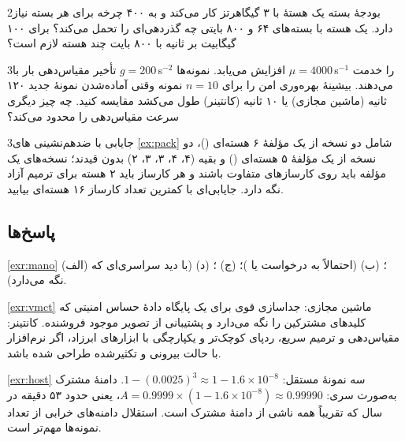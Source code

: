 \documentclass[11pt,a4paper]{article}
\begin{document}
\begin{exercisebox}{2}{بودجهٔ بسته}\label{exr:cycles}
یک هستهٔ  با ۳ گیگاهرتز کار می‌کند و به ۴۰۰ چرخه برای هر بسته نیاز دارد. یک هسته با بسته‌های ۶۴ و ۸۰۰ بایتی چه
گذردهی‌ای را تحمل می‌کند؟ برای ۱۰۰ گیگابیت بر ثانیه با ۸۰۰ بایت چند هسته لازم است؟
\end{exercisebox}

\begin{exercisebox}{3}{تأخیر مقیاس‌دهی}\label{exr:lag}
بار با $g = 200$\,s$^{-2}$ افزایش می‌یابد. نمونه‌ها $\mu = 4000$\,s$^{-1}$ را خدمت می‌دهند. بیشینهٔ بهره‌وری امن را برای $n = 10$
نمونه وقتی آماده‌شدن نمونهٔ جدید ۱۲۰ ثانیه (ماشین مجازی) یا ۱۰ ثانیه (کانتینر) طول می‌کشد مقایسه کنید. چه چیز دیگری سرعت
مقیاس‌دهی را محدود می‌کند؟
\end{exercisebox}

\begin{exercisebox}{3}{جایابی با ضدهم‌نشینی}\label{exr:pack}
های \cref{ex:pack} شامل دو نسخه از یک مؤلفهٔ ۶ هسته‌ای ()، دو نسخه از یک مؤلفهٔ ۵ هسته‌ای () و بقیه
(۴، ۴، ۳، ۳، ۲) بدون قیدند؛ نسخه‌های یک مؤلفه باید روی کارسازهای متفاوت باشند و هر کارساز باید ۲ هسته برای ترمیم آزاد نگه
دارد. جایابی‌ای با کمترین تعداد کارساز ۱۶ هسته‌ای بیابید.
\end{exercisebox}

\subsection*{پاسخ‌ها}

\begin{solutionbox}{\ref{exr:mano}}
(الف) ؛ (ب)  (احتمالاً به درخواست  یا )؛ (ج) ؛ (د)  (با دید
سراسری‌ای که  نگه می‌دارد).
\end{solutionbox}

\begin{solutionbox}{\ref{exr:vmct}}
ماشین مجازی: جداسازی قوی برای یک پایگاه دادهٔ حساس امنیتی که کلیدهای مشترکین را نگه می‌دارد و پشتیبانی از تصویر موجود
فروشنده. کانتینر: مقیاس‌دهی و ترمیم سریع، ردپای کوچک‌تر و یکپارچگی با ابزارهای ابرزاد، اگر نرم‌افزار  با حالت
بیرونی و تکثیرشده طراحی شده باشد.
\end{solutionbox}

\begin{solutionbox}{\ref{exr:host}}
سه نمونهٔ مستقل: $1-(0.0025)^3 \approx 1-1.6\times10^{-8}$. دامنهٔ مشترک به‌صورت سری: $A = 0.9999\times(1-1.6\times10^{-8})
\approx 0.99990$، یعنی حدود ۵۳ دقیقه در سال که تقریباً همه ناشی از دامنهٔ مشترک است. استقلال دامنه‌های خرابی از تعداد نمونه‌ها
مهم‌تر است.
\end{solutionbox}
\end{document}
